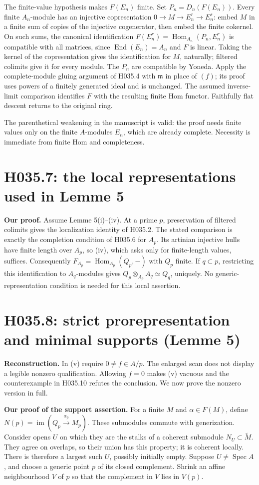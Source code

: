 The finite-value hypothesis makes $F(E_n)$ finite. Set
$P_n=D_n(F(E_n))$. Every finite $A_n$-module has an injective
copresentation $0\to M\to E_n^r\to E_n^s$: embed $M$ in a finite
sum of copies of the injective cogenerator, then embed the finite
cokernel. On such sums, the canonical identification
$F(E_n^r)=\operatorname{Hom}_{A_n}(P_n,E_n^r)$ is compatible with
all matrices, since $\operatorname{End}(E_n)=A_n$ and $F$ is linear.
Taking the kernel of the copresentation gives the identification for
$M$, naturally; filtered colimits give it for every module. The $P_n$
are compatible by Yoneda. Apply the complete-module gluing argument of
H035.4 with $\mathfrak m$ in place of $(f)$; its proof uses powers of a
finitely generated ideal and is unchanged. The assumed inverse-limit
comparison identifies $F$ with the resulting finite Hom functor.
Faithfully flat descent returns to the original ring.

The parenthetical weakening in the manuscript is valid: the proof needs
finite values only on the finite $A$-modules $E_n$, which are already
complete. Necessity is immediate from finite Hom and completeness.

\section{H035.7: the local representations used in Lemme 5}
\textbf{Our proof.} Assume Lemme 5(i)--(iv). At a prime $p$, preservation
of filtered colimits gives the localization identity of H035.2.
The stated comparison is exactly the completion condition of H035.6
for $A_p$. Its artinian injective hulls have finite length over $A_p$,
so (iv), which asks only for finite-length values, suffices. Consequently
$F_{A_p}=\operatorname{Hom}_{A_p}(Q_p,-)$ with $Q_p$ finite. If
$q\subset p$, restricting this identification to $A_q$-modules gives
$Q_p\otimes_{A_p}A_q\simeq Q_q$, uniquely. No generic-representation
condition is needed for this local assertion.

\section{H035.8: strict prorepresentation and minimal supports (Lemme 5)}
\textbf{Reconstruction.} In (v) require $0\ne f\in A/p$. The enlarged
scan does not display a legible nonzero qualification. Allowing $f=0$
makes (v) vacuous and the counterexample in H035.10 refutes the conclusion.
We now prove the nonzero version in full.

\textbf{Our proof of the support assertion.} For a finite $M$ and
$\alpha\in F(M)$, define
$N(p)=\operatorname{im}(Q_p\xrightarrow{\alpha_p}M_p)$.
These submodules commute with generization. Consider opens $U$ on which
they are the stalks of a coherent submodule $N_U\subset\widetilde M$.
They agree on overlaps, so their union has this property; it is coherent
locally. There is therefore a largest such $U$, possibly initially empty.
Suppose $U\ne\operatorname{Spec}A$, and choose a generic point $p$ of
its closed complement. Shrink an affine neighbourhood $V$ of $p$ so that
the complement in $V$ lies in $V(p)$.

